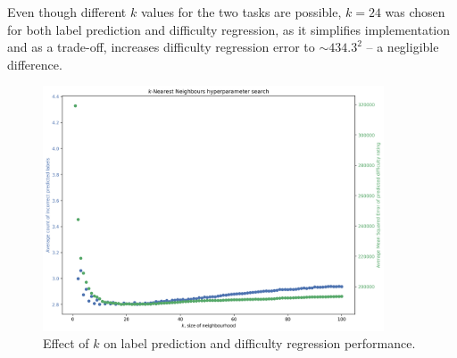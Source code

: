 Even though different $k$ values for the two tasks are possible, $k=24$ was
chosen for both label prediction and difficulty regression, as it simplifies
implementation and as a trade-off, increases difficulty regression error to
$\sim\!434.3^2$ -- a negligible difference. 

\begin{figure}[H]
  \centering
  \includegraphics[width=0.9\textwidth]{project/img/knn.png}
  \caption{Effect of $k$ on label prediction and difficulty regression performance.}
  \label{knn}
\end{figure}


